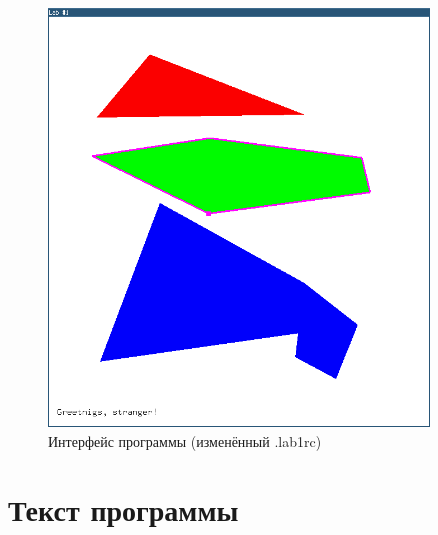 \documentclass[oneside, final, 10pt]{extarticle}
\begin{document}
\begin{figure}[t]
	\centering
	\includegraphics[width=0.9\textwidth]{screen/rcd}
	\caption{Интерфейс программы (изменённый .lab1rc)}
	\label{rcd}
\end{figure}

\section{Текст программы}

\lstset{caption=lab1.py}

\end{document}
